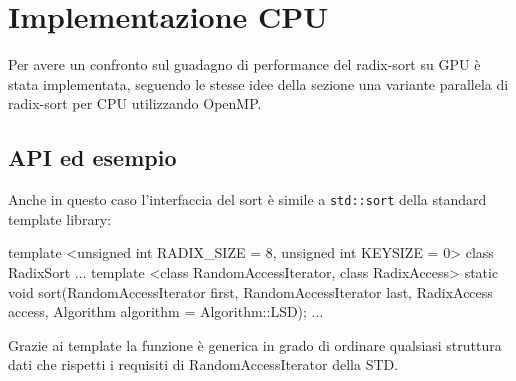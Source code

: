 \section{Implementazione CPU}
Per avere un confronto sul guadagno di performance del radix-sort su GPU è stata implementata, seguendo le stesse idee della sezione  una variante parallela di radix-sort per CPU utilizzando OpenMP.

\subsection{API ed esempio}
Anche in questo caso l'interfaccia del sort è simile a \texttt{std::sort} della standard template library:

\begin{cpp}
template <unsigned int RADIX_SIZE = 8, unsigned int KEYSIZE = 0>
class RadixSort{
	...
	template <class RandomAccessIterator, class RadixAccess>
	static void sort(RandomAccessIterator first, 
	                 RandomAccessIterator last, 
	                 RadixAccess access, 
	                 Algorithm algorithm = Algorithm::LSD);	
	...
}
\end{cpp}
Grazie ai template la funzione è generica in grado di ordinare qualsiasi struttura dati che rispetti i requisiti di RandomAccessIterator della STD.

